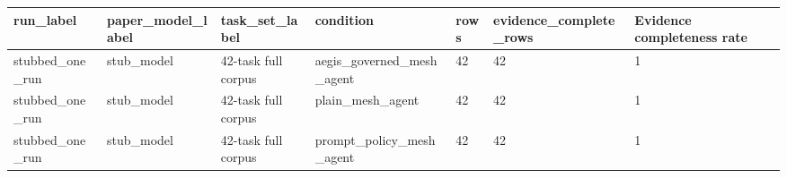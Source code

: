 \begin{tabular}{lllllll}
 \hline
run\_label & paper\_model\_label & task\_set\_label & condition & rows & evidence\_complete\_rows & Evidence completeness rate \\
 \hline
stubbed\_one\_run & stub\_model & 42-task full corpus & aegis\_governed\_mesh\_agent & 42 & 42 & 1 \\
stubbed\_one\_run & stub\_model & 42-task full corpus & plain\_mesh\_agent & 42 & 42 & 1 \\
stubbed\_one\_run & stub\_model & 42-task full corpus & prompt\_policy\_mesh\_agent & 42 & 42 & 1 \\
 \hline
\end{tabular}
